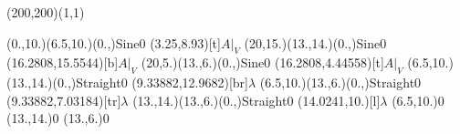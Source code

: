 \unitlength=1bp%

\begin{feynartspicture}(200,200)(1,1)

\FADiagram{}
\FAProp(0.,10.)(6.5,10.)(0.,){Sine}{0}
\FALabel(3.25,8.93)[t]{$A|_V$}
\FAProp(20,15.)(13.,14.)(0.,){Sine}{0}
\FALabel(16.2808,15.5544)[b]{$A|_V$}
\FAProp(20,5.)(13.,6.)(0.,){Sine}{0}
\FALabel(16.2808,4.44558)[t]{$A|_V$}
\FAProp(6.5,10.)(13.,14.)(0.,){Straight}{0}
\FALabel(9.33882,12.9682)[br]{$\lambda$}
\FAProp(6.5,10.)(13.,6.)(0.,){Straight}{0}
\FALabel(9.33882,7.03184)[tr]{$\lambda$}
\FAProp(13.,14.)(13.,6.)(0.,){Straight}{0}
\FALabel(14.0241,10.)[l]{$\lambda$}
\FAVert(6.5,10.){0}
\FAVert(13.,14.){0}
\FAVert(13.,6.){0}
\end{feynartspicture}

